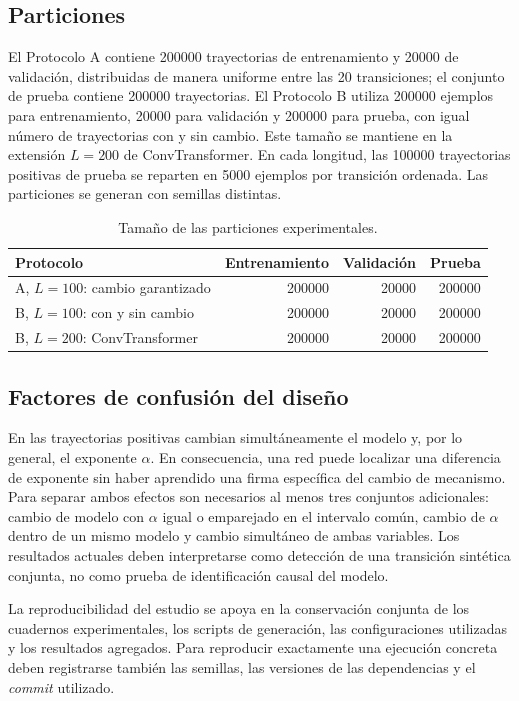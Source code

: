 \documentclass[a4paper,12pt]{article}
\begin{document}
\subsection{Particiones}

El Protocolo A contiene 200000 trayectorias de entrenamiento y 20000 de validación, distribuidas de manera uniforme entre las 20 transiciones; el conjunto de prueba contiene 200000 trayectorias. El Protocolo B utiliza 200000 ejemplos para entrenamiento, 20000 para validación y 200000 para prueba, con igual número de trayectorias con y sin cambio. Este tamaño se mantiene en la extensión $L=200$ de ConvTransformer. En cada longitud, las 100000 trayectorias positivas de prueba se reparten en 5000 ejemplos por transición ordenada. Las particiones se generan con semillas distintas.

\begin{table}[htbp]
\centering
\begin{tabular}{lrrr}
\toprule
\textbf{Protocolo} & \textbf{Entrenamiento} & \textbf{Validación} & \textbf{Prueba} \\
\midrule
A, $L=100$: cambio garantizado & 200000 & 20000 & 200000 \\
B, $L=100$: con y sin cambio & 200000 & 20000 & 200000 \\
B, $L=200$: ConvTransformer & 200000 & 20000 & 200000 \\
\bottomrule
\end{tabular}
\caption{Tamaño de las particiones experimentales.}
\label{tab:data-splits}
\end{table}

\subsection{Factores de confusión del diseño}

En las trayectorias positivas cambian simultáneamente el modelo y, por lo general, el exponente $\alpha$. En consecuencia, una red puede localizar una diferencia de exponente sin haber aprendido una firma específica del cambio de mecanismo. Para separar ambos efectos son necesarios al menos tres conjuntos adicionales: cambio de modelo con $\alpha$ igual o emparejado en el intervalo común, cambio de $\alpha$ dentro de un mismo modelo y cambio simultáneo de ambas variables. Los resultados actuales deben interpretarse como detección de una transición sintética conjunta, no como prueba de identificación causal del modelo.

La reproducibilidad del estudio se apoya en la conservación conjunta de los cuadernos experimentales, los scripts de generación, las configuraciones utilizadas y los resultados agregados. Para reproducir exactamente una ejecución concreta deben registrarse también las semillas, las versiones de las dependencias y el \emph{commit} utilizado.
\end{document}

